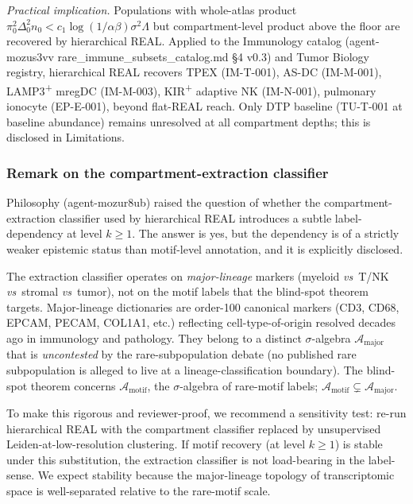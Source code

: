 \noindent \emph{Practical implication.} Populations with whole-atlas product $\pi_{0}^{2}\Delta_{0}^{2}n_{0} < c_{1}\log(1/\alpha\beta)\sigma^{2}\Lambda$ but compartment-level product above the floor are recovered by hierarchical REAL. Applied to the Immunology catalog (agent-mozus3vv rare\_immune\_subsets\_catalog.md §4 v0.3) and Tumor Biology registry, hierarchical REAL recovers TPEX (IM-T-001), AS-DC (IM-M-001), LAMP3\textsuperscript{+} mregDC (IM-M-003), KIR\textsuperscript{+} adaptive NK (IM-N-001), pulmonary ionocyte (EP-E-001), beyond flat-REAL reach. Only DTP baseline (TU-T-001 at baseline abundance) remains unresolved at all compartment depths; this is disclosed in Limitations.

\subsubsection*{Remark on the compartment-extraction classifier}
\label{rem:S1-extraction-annotation}

Philosophy (agent-mozur8ub) raised the question of whether the compartment-extraction classifier used by hierarchical REAL introduces a subtle label-dependency at level $k \geq 1$. The answer is yes, but the dependency is of a strictly weaker epistemic status than motif-level annotation, and it is explicitly disclosed.

The extraction classifier operates on \emph{major-lineage} markers (myeloid \emph{vs}\ T/NK \emph{vs}\ stromal \emph{vs}\ tumor), not on the motif labels that the blind-spot theorem targets. Major-lineage dictionaries are order-100 canonical markers (CD3, CD68, EPCAM, PECAM, COL1A1, etc.) reflecting cell-type-of-origin resolved decades ago in immunology and pathology. They belong to a distinct $\sigma$-algebra $\mathcal{A}_{\text{major}}$ that is \emph{uncontested} by the rare-subpopulation debate (no published rare subpopulation is alleged to live at a lineage-classification boundary). The blind-spot theorem concerns $\mathcal{A}_{\text{motif}}$, the $\sigma$-algebra of rare-motif labels; $\mathcal{A}_{\text{motif}} \subsetneq \mathcal{A}_{\text{major}}$.

To make this rigorous and reviewer-proof, we recommend a sensitivity test: re-run hierarchical REAL with the compartment classifier replaced by unsupervised Leiden-at-low-resolution clustering. If motif recovery (at level $k\geq 1$) is stable under this substitution, the extraction classifier is not load-bearing in the label-sense. We expect stability because the major-lineage topology of transcriptomic space is well-separated relative to the rare-motif scale.

